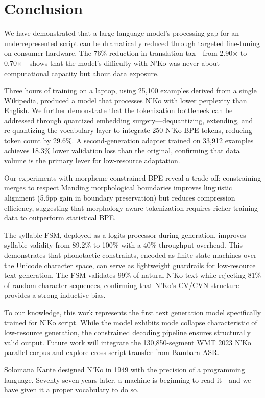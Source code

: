 \documentclass[11pt]{article}
\begin{document}
\section{Conclusion}

We have demonstrated that a large language model's processing gap for an underrepresented script can be dramatically reduced through targeted fine-tuning on consumer hardware.
The 76\% reduction in translation tax---from 2.90$\times$ to 0.70$\times$---shows that the model's difficulty with N'Ko was never about computational capacity but about data exposure.

Three hours of training on a laptop, using 25,100 examples derived from a single Wikipedia, produced a model that processes N'Ko with lower perplexity than English.
We further demonstrate that the tokenization bottleneck can be addressed through quantized embedding surgery---dequantizing, extending, and re-quantizing the vocabulary layer to integrate 250 N'Ko BPE tokens, reducing token count by 29.6\%.
A second-generation adapter trained on 33,912 examples achieves 18.3\% lower validation loss than the original, confirming that data volume is the primary lever for low-resource adaptation.

Our experiments with morpheme-constrained BPE reveal a trade-off: constraining merges to respect Manding morphological boundaries improves linguistic alignment (5.6pp gain in boundary preservation) but reduces compression efficiency, suggesting that morphology-aware tokenization requires richer training data to outperform statistical BPE.

The syllable FSM, deployed as a logits processor during generation, improves syllable validity from 89.2\% to 100\% with a 40\% throughput overhead.
This demonstrates that phonotactic constraints, encoded as finite-state machines over the Unicode character space, can serve as lightweight guardrails for low-resource text generation.
The FSM validates 99\% of natural N'Ko text while rejecting 81\% of random character sequences, confirming that N'Ko's CV/CVN structure provides a strong inductive bias.

To our knowledge, this work represents the first text generation model specifically trained for N'Ko script.
While the model exhibits mode collapse characteristic of low-resource generation, the constrained decoding pipeline ensures structurally valid output.
Future work will integrate the 130,850-segment WMT 2023 N'Ko parallel corpus and explore cross-script transfer from Bambara ASR.

Solomana Kante designed N'Ko in 1949 with the precision of a programming language.
Seventy-seven years later, a machine is beginning to read it---and we have given it a proper vocabulary to do so.


\end{document}

